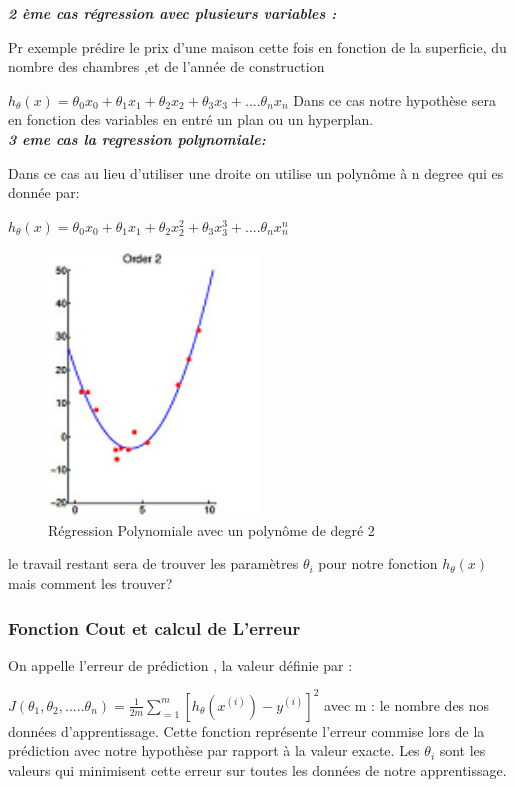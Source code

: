 \textbf{\emph{2 ème cas régression avec plusieurs variables :}}

Pr exemple prédire le prix d'une maison cette fois en fonction de la superficie, du nombre des chambres ,et de l'année de construction

${h}_{\theta}\left(x\right)={\theta }_{0}{x}_{0}+{\theta }_{1}{x}_{1}+{\theta }_{2}{x}_{2}+{\theta }_{3}{x}_{3}+....{\theta }_{n}{x}_{n}$
Dans ce cas notre hypothèse sera en fonction des variables en entré un plan ou un hyperplan.\\

\textbf{\emph{3 eme cas la regression polynomiale:}}

Dans ce cas au lieu d'utiliser une droite on utilise un polynôme à n degree qui es donnée par:

${h}_{\theta}\left(x\right)={\theta }_{0}{x}_{0}+{\theta }_{1}{x}_{1}+{\theta }_{2}{x}_{2}^{2}+{\theta }_{3}{x}_{3}^{3}+....{\theta }_{n}{x}_{n}^{n}$
\begin{figure}[ht]
	\centering
	\includegraphics[width=0.5\textwidth]{fig/regressionPlokynome.png}
	\caption{Régression Polynomiale avec un polynôme de degré 2}
	\label{fig:image2}
\end{figure}
le travail restant sera de trouver les paramètres ${\theta }_{i}$ pour notre fonction  ${h}_{\theta}\left(x\right)$ mais comment les trouver?

\subsubsection{Fonction Cout et calcul de L'erreur }
On appelle l'erreur de prédiction , la valeur définie par   :

 $J\left({\theta }_{1},{\theta }_{2},.....{\theta }_{n}\right)=\frac{1}{2m}\sum _{=1}^{m}{\left[{h}_{\theta}\left({x}^{(i)}\right) - {y}^{(i)}\right]}^2$
 avec m : le nombre des nos données d'apprentissage.
 Cette fonction représente l'erreur commise lors de la prédiction avec notre hypothèse par rapport à la valeur exacte.
 Les  ${\theta }_{i}$ sont les valeurs qui minimisent cette erreur sur toutes les données de notre apprentissage.
 
